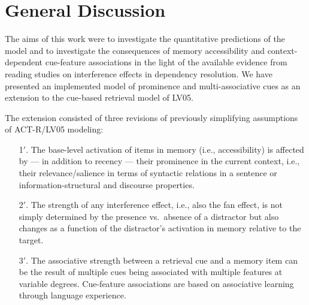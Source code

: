 \documentclass{cambridge7A}\usepackage[]{graphicx}\usepackage[]{color}
\newcommand{\revFE}[1]{#1}
\newcommand{\revV}[1]{#1}
\begin{document}
\section{General Discussion}
The aims of this work were to investigate the quantitative predictions of the \cite{LewisVasishth2005} model and to investigate the consequences of memory accessibility and context-dependent cue-feature associations in the light of the available evidence from reading studies on interference effects in dependency resolution.
We have presented an implemented model of prominence and multi-associative cues as an extension to the cue-based retrieval model of LV05. 
\revFE{
The extension consisted of three revisions of previously simplifying assumptions of ACT-R/LV05 modeling:

\begin{enumerate}
  \item[1$'$.] The base-level activation of items in memory (i.e., accessibility) is affected by --- in addition to recency --- their prominence in the current context, i.e., their  relevance/salience in terms of syntactic relations in a sentence or information-structural and discourse properties.
  \item[2$'$.] The strength of any interference effect, i.e., also the fan effect, is not simply \revV{determined by} the presence vs.\ absence of a distractor but also changes as a function of the distractor's activation in memory relative to the target.
  \item[3$'$.] The associative strength between a retrieval cue and a memory item can be the result of multiple cues being associated with multiple features at variable degrees. Cue-feature associations are based on associative learning through language experience. 
\end{enumerate}
}
\end{document}
